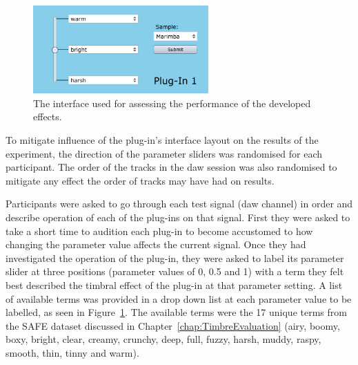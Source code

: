 			\begin{figure}[h!]
				\centering
				\includegraphics[width=0.6\textwidth]{chapter7/Images/TestPlugInInterface.png}
				\caption{The interface used for assessing the performance of the developed effects.}
				\label{fig:TestPlugInterface}
			\end{figure}

			To mitigate influence of the plug-in's interface layout on the results of the experiment, the
			direction of the parameter sliders was randomised for each participant. The order of the tracks in
			the \acrshort{daw} session was also randomised to mitigate any effect the order of tracks may have
			had on results.

			Participants were asked to go through each test signal (\acrshort{daw} channel) in order and
			describe operation of each of the plug-ins on that signal. First they were asked to take a short
			time to audition each plug-in to become accustomed to how changing the parameter value affects the
			current signal. Once they had investigated the operation of the plug-in, they were asked to label
			its parameter slider at three positions (parameter values of 0, 0.5 and 1) with a term they felt
			best described the timbral effect of the plug-in at that parameter setting. A list of available
			terms was provided in a drop down list at each parameter value to be labelled, as seen in
			Figure~\ref{fig:TestPlugInterface}. The available terms were the 17 unique terms from the SAFE
			dataset discussed in Chapter~\ref{chap:TimbreEvaluation} (airy, boomy, boxy, bright, clear, creamy,
			crunchy, deep, full, fuzzy, harsh, muddy, raspy, smooth, thin, tinny and warm).

